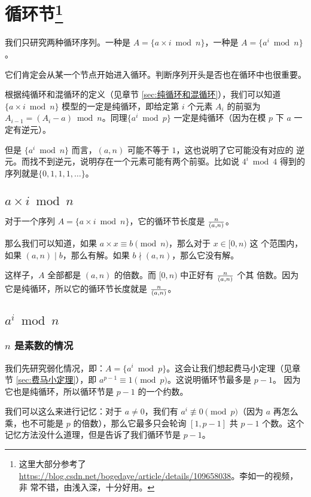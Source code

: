 \section[循环节]{循环节\protect\footnote{这里大部分参考了
\url{https://blog.csdn.net/bogedaye/article/details/109658038}。李如一的视频，非
常不错，由浅入深，十分好用。}}
\label{sec:循环节}

我们只研究两种循环序列。一种是 $A = \{a \times i \bmod n\}$，一种是 $A = \{a^i
\bmod n\}$。

它们肯定会从某一个节点开始进入循环。判断序列开头是否也在循环中也很重要。

根据纯循环和混循环的定义（见章节 \ref{sec:纯循环和混循环}），我们可以知道 $\{a
\times i \bmod n\}$ 模型的一定是纯循环，即给定第 $i$ 个元素 $A_i$ 的前驱为
$A_{i-1} = (A_i - a) \bmod n$。同理$\{a^i \bmod p\}$ 一定是纯循环（因为在模 $p$
下 $a$ 一定有逆元）。

但是 $\{a^i \bmod n\}$ 而言，$(a, n)$ 可能不等于 $1$，这也说明了它可能没有对应的
逆元。而找不到逆元，说明存在一个元素可能有两个前驱。比如说 $4^i \bmod 4$ 得到的
序列就是$\{0, 1, 1, 1, \ldots\}$。



\subsection{$a \times i \bmod n$}
对于一个序列 $A = \{a \times i \bmod n\}$，它的循环节长度是 $n \over (a, n)$。

那么我们可以知道，如果 $a \times x \equiv b \pmod n$，那么对于 $x \in [0, n)$ 这
个范围内，如果 $(a, n) \mid b$，那么有解。如果 $b \nmid (a, n)$，那么它没有解。

这样子，$A$ 全部都是 $(a, n)$ 的倍数。而 $[0, n)$ 中正好有 $n \over (a, n)$ 个其
倍数。因为它是纯循环，所以它的循环节长度就是 $n \over (a, n)$。



\subsection{$a^i \bmod n$}
\subsubsection{$n$ 是素数的情况}
我们先研究弱化情况，即：$A = \{a^i \bmod p\}$。这会让我们想起费马小定理（见章节
\ref{sec:费马小定理}），即 $a^{p-1} \equiv 1 \pmod p$。这说明循环节最多是 $p - 1$。
因为它也是纯循环，所以循环节是 $p - 1$ 的一个约数。

我们可以这么来进行记忆：对于 $a \neq 0$，我们有 $a^i \not\equiv 0 \pmod p$（因为
$a$ 再怎么乘，也不可能是 $p$ 的倍数），那么它最多只会轮询 $[1, p-1]$ 共 $p - 1$
个数。这个记忆方法没什么道理，但是告诉了我们循环节是 $p - 1$。


